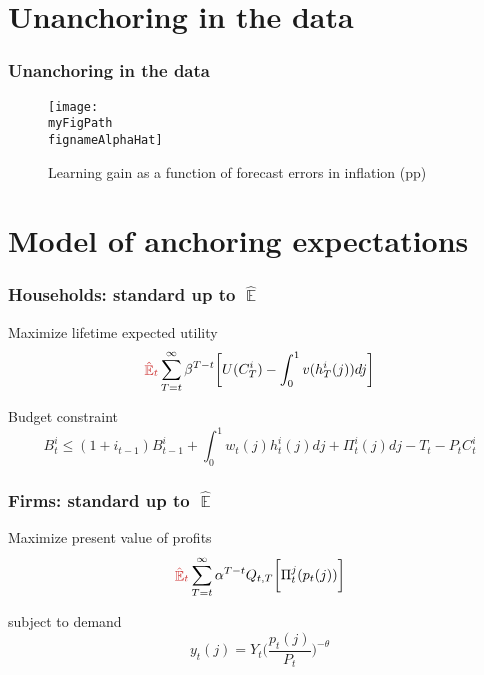 \documentclass[10pt]{beamer}
\def \myFigPath {../../../figures/}
\DeclareMathOperator{\E}{\mathbb{E}}
\def\mySmallerFigScale{0.18}
\def\fignameAlphaHat{alph_opt_constant_only_pi_only_N_100_nfe_5femax_2_loss_382_gridspacing_manual_Wdiffs2_100000_Wmid_1000_Nsimulations_scaleW_0_use_expectations_0_use_meas_error_0_command_GMM_LOMgain_univariate_12_Aug_2020_09_16_29}
\begin{document}
\section{Unanchoring in the data}

\begin{frame}
	\frametitle{Unanchoring in the data}

\begin{figure}[h!]
\texttt{[image: \\myFigPath \\fignameAlphaHat]}
\caption{Learning gain as a function of forecast errors in inflation (pp)}
\label{epi}
\end{figure}


\end{frame}

\section{Model of anchoring expectations}

\begin{frame}
	\frametitle{Households: standard up to $\hat{\E}$}
	\label{HH}

Maximize lifetime expected utility
\begin{equation}
\textcolor{brownreddark}{\hat{\E}_t}\sum^{\infty}_{T=t}\beta^{T-t} \bigg[ U(C^i_T) - \int_0^1 v(h^i_T(j)) dj \bigg]
\label{lifetime_U}
\end{equation}	

Budget constraint
\begin{equation}
 B^i_t \leq (1+i_{t-1})B^i_{t-1} + \int_0^1 w_t(j)h^i_t(j) dj + \Pi_t^i(j)  dj-T_t -P_tC^i_t
 \label{BC}
\end{equation}



\vfill

\hfill \hyperlink{details_HHs_firms}{}
\end{frame}

\begin{frame}
	\frametitle{Firms: standard up to $\hat{\E}$}

Maximize present value of profits
\begin{equation}
\textcolor{brownreddark}{\hat{\E}_t}\sum^{\infty}_{T=t}\alpha^{T-t} Q_{t,T} \bigg[ \Pi^j_t(p_t(j))\bigg]
\label{lifetime_profits}
\end{equation}

subject to demand
\begin{equation}
y_t(j) = Y_t \bigg(\frac{p_t(j)}{P_t}\bigg)^{-\theta}
\end{equation}


\vfill

\hfill \hyperlink{details_HHs_firms}{}

\end{frame}
\end{document}
